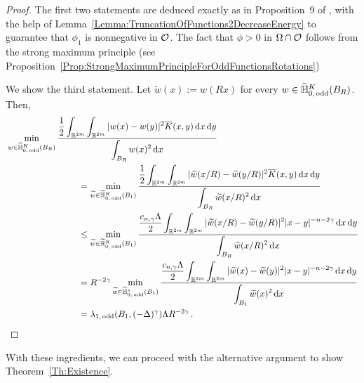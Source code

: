 \begin{proof}
The first two statements are deduced exactly as in Proposition~9 of \cite{ServadeiValdinoci}, with the help of Lemma~\ref{Lemma:TruncationOfFunctions2DecreaseEnergy} to guarantee that $\phi_1$ is nonnegative in $\mathcal{O}$. The fact that $\phi > 0$ in $\Omega \cap \mathcal{O}$ follows from the strong maximum principle (see Proposition~\ref{Prop:StrongMaximumPrincipleForOddFunctionsRotations})

We show the third statement. Let $\widetilde{w} (x):= w(Rx)$ for every $w\in \widetilde{\mathbb{H}}^K_{0, \, \mathrm{odd}}(B_R)$. Then,
\begin{align*}
 & \min_{w \in \widetilde{\mathbb{H}}^K_{0, \, \mathrm{odd}}(B_R)} \dfrac{\dfrac{1}{2}  \displaystyle\int_{\mathbb{R}^{2m}} \int_{\mathbb{R}^{2m}} |w(x) - w(y)|^2 \overline{K}(x,y) \,\mathrm{d} x \,\mathrm{d} y}{ \displaystyle \int_{B_R} w(x)^2 \,\mathrm{d} x} \quad \quad \quad \quad \quad \quad \quad \quad \quad \quad \quad \quad\\
&  \quad \quad \quad \quad \quad \quad \quad \quad = \min_{\widetilde{w} \in \widetilde{\mathbb{H}}^K_{0, \, \mathrm{odd}}(B_1)} \dfrac{\dfrac{1}{2}  \displaystyle\int_{\mathbb{R}^{2m}} \int_{\mathbb{R}^{2m}} |\widetilde{w}(x/R) - \widetilde{w}(y/R)|^2 \overline{K}(x,y) \,\mathrm{d} x \,\mathrm{d} y}{ \displaystyle \int_{B_R} \widetilde{w}(x/R)^2 \,\mathrm{d} x} \\
 &  \quad \quad \quad \quad \quad \quad \quad \quad \leq \min_{\widetilde{w} \in \widetilde{\mathbb{H}}^K_{0, \, \mathrm{odd}}(B_1)} \dfrac{\dfrac{c_{n, \gamma}\Lambda}{2}  \displaystyle\int_{\mathbb{R}^{2m}} \int_{\mathbb{R}^{2m}} |\widetilde{w}(x/R) - \widetilde{w}(y/R)|^2 |x - y|^{-n-2 \gamma}\,\mathrm{d} x \,\mathrm{d} y}{ \displaystyle \int_{B_R} \widetilde{w}(x/R)^2 \,\mathrm{d} x}
\\
& \quad \quad \quad \quad \quad \quad \quad \quad = R^{-2 \gamma }\min_{\widetilde{w} \in \widetilde{\mathbb{H}}^s_{0, \, \mathrm{odd}}(B_1)} \dfrac{\dfrac{c_{n, \gamma}\Lambda}{2}  \displaystyle\int_{\mathbb{R}^{2m}} \int_{\mathbb{R}^{2m}} |\widetilde{w}(x) - \widetilde{w}(y)|^2 |x - y|^{-n-2 \gamma}\,\mathrm{d} x \,\mathrm{d} y}{ \displaystyle \int_{B_1} \widetilde{w}(x)^2 \,\mathrm{d} x}
\\
& \quad \quad \quad \quad \quad \quad \quad \quad = \lambda_{1, \, \mathrm{odd}}(B_1, (-\Delta)^\gamma) \Lambda R^{-2 \gamma } \,.
\end{align*}
\end{proof}


With these ingredients, we can proceed with the alternative argument to show Theorem~\ref{Th:Existence}.


